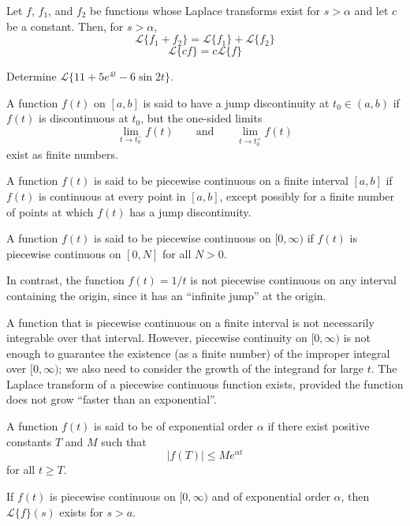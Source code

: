 \documentclass[../diffeq.tex]{subfiles}
\begin{document}
\begin{theorem}
    Let $f$, $f_1$, and $f_2$ be functions whose Laplace transforms exist for $s>\alpha$ and let $c$ be a constant. Then, for $s>\alpha$, 
    \[ \mathcal{L}\{f_1+f_2\} = \mathcal{L}\{f_1\} + \mathcal{L}\{f_2\} \]
    \[ \mathcal{L}\{cf\}=c\mathcal{L}\{f\} \]
\end{theorem}

\ex Determine $\mathcal{L}\{11+5e^{4t}-6\sin 2t\}$.

A function $f(t)$ on $[a,b]$ is said to have a jump discontinuity at $t_0\in (a,b)$ if $f(t)$ is discontinuous at $t_0$, but the one-sided limits 
\[ \lim_{t\to t_0^-}f(t) \qquad \text{and} \qquad \lim_{t\to t_0^+}f(t) \]
exist as finite numbers.

\pagebreak
\begin{definition}
    A function $f(t)$ is said to be piecewise continuous on a finite interval $[a,b]$ if $f(t)$ is continuous at every point in $[a,b]$, except possibly for a finite number of points at which $f(t)$ has a jump discontinuity.

    A function $f(t)$ is said to be piecewise continuous on $[0,\infty)$ if $f(t)$ is piecewise continuous on $[0,N]$ for all $N>0$.
\end{definition}

In contrast, the function $f(t)=1/t$ is not piecewise continuous on any interval containing the origin, since it has an ``infinite jump'' at the origin.

A function that is piecewise continuous on a finite interval is not necessarily integrable over that interval. However, piecewise continuity on $[0,\infty)$ is not enough to guarantee the existence (as a finite number) of the improper integral over 
$[0,\infty)$; we also need to consider the growth of the integrand for large $t$. The Laplace transform of a piecewise continuous function exists, provided the function does not grow ``faster than an exponential''.

\begin{definition}
    A function $f(t)$ is said to be of exponential order $\alpha$ if there exist positive constants $T$ and $M$ such that 
    \[ |f(T)|\leq Me^{\alpha t} \]
    for all $t\geq T$.
\end{definition}

\begin{theorem}
    If $f(t)$ is piecewise continuous on $[0,\infty)$ and of exponential order $\alpha$, then $\mathcal{L}\{f\}(s)$ exists for $s>a$.
\end{theorem}
\end{document}

